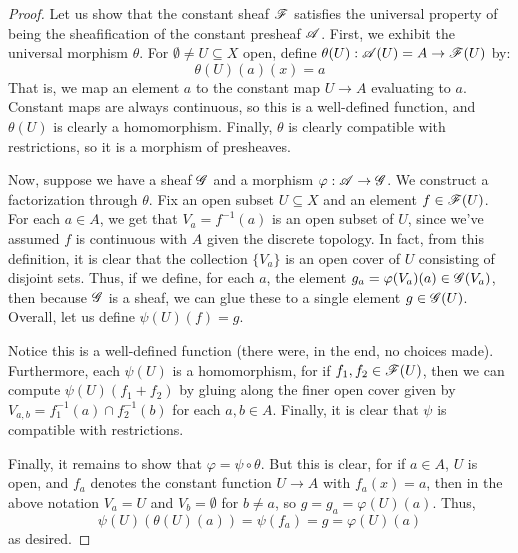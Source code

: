 \begin{proof}
	Let us show that the constant sheaf $\mathscr{F}$ satisfies the universal property of being the sheafification of the constant presheaf $\mathscr{A}$. First, we exhibit the universal morphism $\theta$. For $\emptyset \neq U \subseteq X$ open, define $\theta(U) : \mathscr{A}(U) = A \to \mathscr{F}(U)$ by:
	\[ \theta(U)(a)(x) = a \]
	That is, we map an element $a$ to the constant map $U \to A$ evaluating to $a$. Constant maps are always continuous, so this is a well-defined function, and $\theta(U)$ is clearly a homomorphism. Finally, $\theta$ is clearly compatible with restrictions, so it is a morphism of presheaves.
	
	Now, suppose we have a sheaf $\mathscr{G}$ and a morphism $\varphi : \mathscr{A} \to \mathscr{G}$. We construct a factorization through $\theta$. Fix an open subset $U \subseteq X$ and an element $f \in \mathscr{F}(U)$. For each $a \in A$, we get that $V_a = f^{-1}(a)$ is an open subset of $U$, since we've assumed $f$ is continuous with $A$ given the discrete topology. In fact, from this definition, it is clear that the collection $\{V_a\}$ is an open cover of $U$ consisting of disjoint sets. Thus, if we define, for each $a$, the element $g_a = \varphi(V_a)(a) \in \mathscr{G}(V_a)$, then because $\mathscr{G}$ is a sheaf, we can glue these to a single element $g \in \mathscr{G}(U)$. Overall, let us define $\psi(U)(f) = g$.	
	
	Notice this is a well-defined function (there were, in the end, no choices made). Furthermore, each $\psi(U)$ is a homomorphism, for if $f_1,f_2 \in \mathscr{F}(U)$, then we can compute $\psi(U)(f_1+f_2)$ by gluing along the finer open cover given by $V_{a,b} = f_1^{-1}(a) \cap f_2^{-1}(b)$ for each $a,b \in A$. Finally, it is clear that $\psi$ is compatible with restrictions.
	
	Finally, it remains to show that $\varphi = \psi \circ \theta$. But this is clear, for if $a \in A$, $U$ is open, and $f_a$ denotes the constant function $U \to A$ with $f_a(x) = a$, then in the above notation $V_a = U$ and $V_b = \emptyset$ for $b \neq a$, so $g = g_a = \varphi(U)(a)$. Thus,
	\[ \psi(U)(\theta(U)(a)) = \psi(f_a) = g = \varphi(U)(a) \]
	as desired.
\end{proof}
